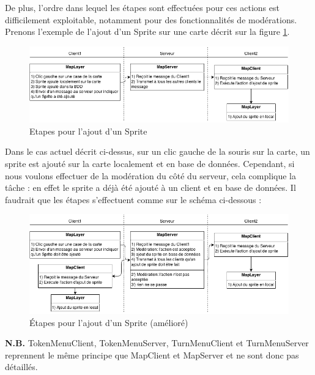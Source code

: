 De plus, l'ordre dans lequel les étapes sont effectuées pour ces actions est difficilement exploitable, notamment pour des fonctionnalités de modérations. Prenons l'exemple de l'ajout d'un Sprite sur une carte décrit sur la figure \ref{fig:network_addsprite}.

\begin{figure}[h!]
	\centering
	\includegraphics[width=1.0\textwidth]{img/network_addsprite.png}
	\caption{Etapes pour l'ajout d'un Sprite}
	\label{fig:network_addsprite}
\end{figure}

Dans le cas actuel décrit ci-dessus, sur un clic gauche de la souris sur la carte, un sprite est ajouté sur la carte localement et en base de données. Cependant, si nous voulons effectuer de la modération du côté du serveur, cela complique la tâche : en effet le sprite a déjà été ajouté à un client et en base de données. Il faudrait que les étapes s'effectuent comme sur le schéma ci-dessous :

\begin{figure}[h!]
	\centering
	\includegraphics[width=1.0\textwidth]{img/network_addsprite_better.png}
	\caption{Étapes pour l'ajout d'un Sprite (amélioré)}
\end{figure}

\textbf{N.B.} TokenMenuClient, TokenMenuServer, TurnMenuClient et TurnMenuServer reprennent le même principe que MapClient et MapServer et ne sont donc pas détaillés.

